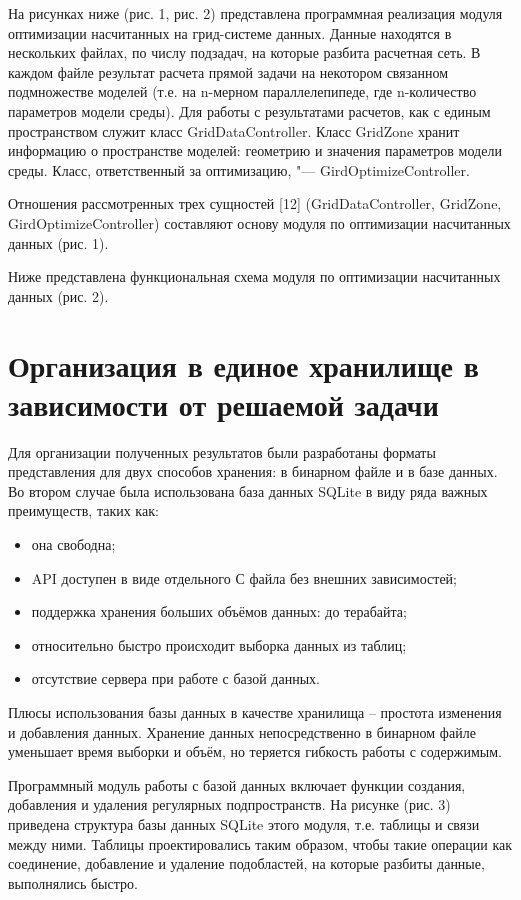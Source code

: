 На рисунках ниже (рис. 1, рис. 2) представлена программная реализация
модуля оптимизации насчитанных на грид-системе данных. Данные находятся в
нескольких файлах, по числу подзадач, на которые разбита расчетная сеть. В
каждом файле результат расчета прямой задачи на некотором связанном
подмножестве моделей (т.е. на n-мерном параллелепипеде, где n-количество
параметров модели среды). Для работы с результатами расчетов, как с единым
пространством служит класс GridDataController. Класс GridZone хранит
информацию о пространстве моделей: геометрию и значения параметров модели
среды. Класс, ответственный за оптимизацию, "--- GirdOptimizeController.

Отношения рассмотренных трех сущностей [12] (GridDataController, GridZone,
GirdOptimizeController) составляют основу модуля по оптимизации насчитанных
данных (рис. 1).

Ниже представлена функциональная схема модуля по оптимизации насчитанных
данных (рис. 2).


\section{Организация в единое хранилище в зависимости от решаемой задачи} \label{sect2_4}

Для организации полученных результатов были разработаны форматы
представления для двух способов хранения: в бинарном файле и в базе данных.
Во втором случае была использована база данных SQLite в виду ряда важных
преимуществ, таких как:
\begin{itemize}
\item она свободна;
\item API доступен в виде отдельного С файла без внешних зависимостей;
\item поддержка хранения больших объёмов данных: до терабайта; 
\item относительно быстро происходит выборка данных из таблиц;
\item отсутствие сервера при работе с базой данных.
\end{itemize}

Плюсы использования базы данных в качестве хранилища – простота изменения и
добавления данных.  Хранение данных непосредственно в бинарном файле
уменьшает время выборки и объём, но теряется гибкость работы с содержимым.

Программный модуль работы с базой данных включает функции создания,
добавления и удаления регулярных подпространств. На рисунке (рис. 3)
приведена структура базы данных SQLite этого модуля, т.е. таблицы и связи
между ними. Таблицы проектировались таким образом, чтобы такие операции как
соединение, добавление и удаление подобластей, на которые разбиты данные,
выполнялись быстро.

